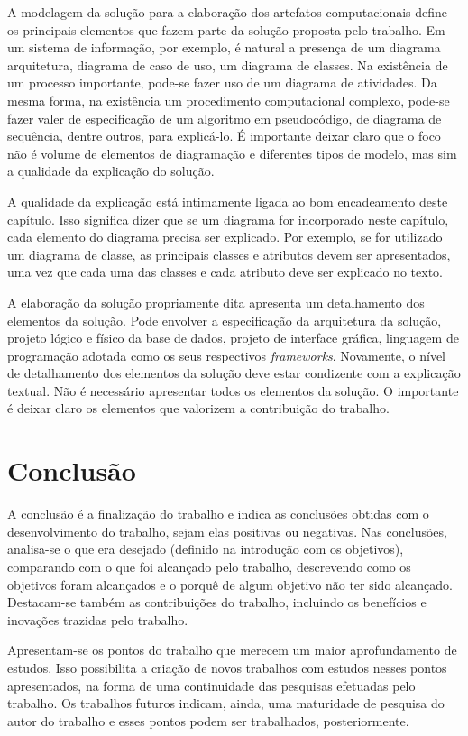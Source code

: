 \documentclass[12pt]{article}
\begin{document}
	A modelagem da solução para a elaboração dos artefatos computacionais define os principais elementos que fazem parte da solução proposta pelo trabalho. Em um sistema de informação, por exemplo, é natural a presença de um diagrama arquitetura, diagrama de caso de uso, um diagrama de classes. Na existência de um processo importante, pode-se fazer uso de um diagrama de atividades. Da mesma forma, na existência um procedimento computacional complexo, pode-se fazer valer de especificação de um algoritmo em pseudocódigo, de diagrama de sequência, dentre outros, para explicá-lo. É importante deixar claro que o foco não é volume de elementos de diagramação e diferentes tipos de modelo, mas sim a qualidade da explicação do solução.
	
	A qualidade da explicação está intimamente ligada ao bom encadeamento deste capítulo. Isso significa dizer que se um diagrama for incorporado neste capítulo, cada elemento do diagrama precisa ser explicado. Por exemplo, se for utilizado um diagrama de classe, as principais classes e atributos devem ser apresentados, uma vez que cada uma das classes e cada atributo deve ser explicado no texto.
	
	A elaboração da solução propriamente dita apresenta um detalhamento dos elementos da solução. Pode envolver a especificação da arquitetura da solução, projeto lógico e físico da base de dados, projeto de interface gráfica, linguagem de programação adotada como os seus respectivos \emph{frameworks}. Novamente, o nível de detalhamento dos elementos da solução deve estar condizente com a explicação textual. Não é necessário apresentar todos os elementos da solução. O importante é deixar claro os elementos que valorizem a contribuição do trabalho.
	
\section{Conclusão}
\label{sec:conclusao}
	
	A conclusão é a finalização do trabalho e indica as conclusões obtidas com o desenvolvimento do trabalho, sejam elas positivas ou negativas. Nas conclusões, analisa-se o que era desejado (definido na introdução com os objetivos), comparando com o que foi alcançado pelo trabalho, descrevendo como os objetivos foram alcançados e o porquê de algum objetivo não ter sido alcançado. Destacam-se também as contribuições do trabalho, incluindo os benefícios e inovações trazidas pelo trabalho.
	
	Apresentam-se os pontos do trabalho que merecem um maior aprofundamento de estudos. Isso possibilita a criação de novos trabalhos com estudos nesses pontos apresentados, na forma de uma continuidade das pesquisas efetuadas pelo trabalho. Os trabalhos futuros indicam, ainda, uma maturidade de pesquisa do autor do trabalho e esses pontos podem ser trabalhados, posteriormente.
	

    
    
	
\end{document}
